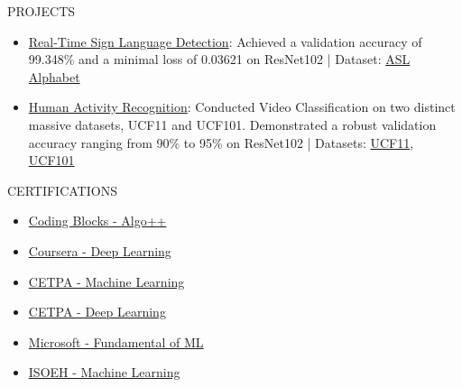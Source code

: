 \documentclass{resume} %
\begin{document}
\begin{rSection}{PROJECTS}
\begin{itemize}
\setlength{\itemsep}{-5pt}
\item {\href{https://github.com/ashuguptahere/sign-language-detection}{Real-Time Sign Language Detection}}{: Achieved a validation accuracy of 99.348\% and a minimal loss of 0.03621 on ResNet102} | Dataset: {\href{https://www.kaggle.com/grassknoted/asl-alphabet}{ASL Alphabet}}
\item {\href{https://github.com/ashuguptahere/video-classification-ucf101}{Human Activity Recognition}}{: Conducted Video Classification on two distinct massive datasets, UCF11 and UCF101. Demonstrated a robust validation accuracy ranging from 90\% to 95\% on ResNet102 | Datasets: {\href{https://www.kaggle.com/ashuguptahere/video-classification-ucf11}{UCF11}}, {\href{https://www.kaggle.com/ashuguptahere/video-classification-ucf101}{UCF101}}
}
\end{itemize}
\end{rSection}

\vspace{-6pt}
\begin{rSection}{CERTIFICATIONS}
\vspace{-6pt}
\begin{multicols}{3}
\begin{itemize}
\setlength{\itemsep}{-6pt}
    \item \href{https://drive.google.com/file/d/1hiyOK3MlFXi0583gJTVbafHLXmegdTvS/view?usp=sharing}{Coding Blocks - Algo++}
    \item \href{https://www.coursera.org/account/accomplishments/specialization/certificate/UCE9XTXVFWEW}{Coursera - Deep Learning}
    \item \href{https://drive.google.com/file/d/1mK1c-I2CtkLyqJjuNWmpbe8s171mp99e/view?usp=sharing}{CETPA - Machine Learning}
    \item \href{https://drive.google.com/file/d/1T7H8U4ZWa9Rv8AQLp2j44RJvE-3HzsC-/view?usp=sharing}{CETPA - Deep Learning}
    \item \href{https://drive.google.com/file/d/1SSPmCUa9mdKV8BjQj_RvWyFiPn-vGKpz/view?usp=sharing}{Microsoft - Fundamental of ML}
    \item \href{https://drive.google.com/file/d/1Pk-nYnK60L8UbcFB3BfSbxoZ3xy0Froh/view}{ISOEH - Machine Learning}
\end{itemize}

\end{multicols}

\end{rSection}
\end{document}
